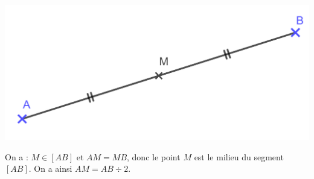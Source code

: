 \documentclass[12pt,a4paper]{article}
\begin{document}
\begin{myex}
	\begin{center}
		\includegraphics[scale=0.25]{img/milieu}
	\end{center}
	
	On a : $M \in [AB]$ et $AM = MB$, donc le point $M$ est le milieu du segment $[AB]$. On a ainsi $AM = AB \div 2$. 
\end{myex}
	
\end{document}
